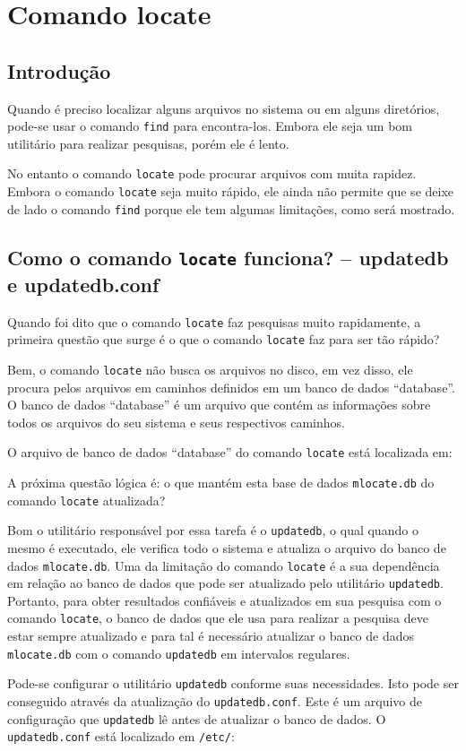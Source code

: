 
\chapter{Comando locate}


\section{Introdução}

Quando é preciso localizar alguns arquivos no sistema ou em alguns diretórios, 
pode-se usar o comando \texttt{find} para encontra-los. Embora ele seja 
um bom utilitário para realizar pesquisas, porém ele é lento.

No entanto o comando \texttt{locate} pode procurar arquivos com muita rapidez. 
Embora o comando \texttt{locate} seja muito rápido, ele ainda não permite
que se deixe de lado o comando \texttt{find} porque ele tem algumas limitações,
como será mostrado.

\section{Como o comando \texttt{locate} funciona? -- updatedb e updatedb.conf}


Quando foi dito que o comando \texttt{locate} faz pesquisas muito rapidamente, 
a primeira questão que surge é o que o comando \texttt{locate} faz para ser tão 
rápido?

Bem, o comando \texttt{locate} não busca os arquivos no disco, em vez disso, 
ele procura pelos arquivos em caminhos definidos em um banco de dados ``database''. 
O banco de dados ``database'' é um arquivo que contém as informações sobre todos
os arquivos do seu sistema e seus respectivos caminhos. 

O arquivo de banco de dados ``database'' do comando \texttt{locate} está 
localizada em:


A próxima questão lógica é: o que mantém esta base de dados \texttt{mlocate.db} 
do comando \texttt{locate} atualizada?

Bom o utilitário responsável por essa tarefa é o \texttt{updatedb}, o qual 
quando o mesmo é executado, ele verifica todo o sistema e atualiza o arquivo 
do banco de dados \texttt{mlocate.db}. Uma da limitação do comando \texttt{locate}
é a sua dependência em relação ao banco de dados que pode ser atualizado 
pelo utilitário \texttt{updatedb}. Portanto, para obter resultados confiáveis e
atualizados em sua pesquisa com o comando \texttt{locate}, o banco de dados 
que ele usa para realizar a pesquisa deve estar sempre atualizado e para tal 
é necessário atualizar o banco de dados \texttt{mlocate.db} com o comando 
\texttt{updatedb} em intervalos regulares.

Pode-se configurar o utilitário \texttt{updatedb} conforme suas necessidades. 
Isto pode ser conseguido através da atualização do \texttt{updatedb.conf}. Este é um 
arquivo de configuração que \texttt{updatedb} lê antes de atualizar o banco de dados. 
O \texttt{updatedb.conf} está localizado em \texttt{/etc/}:
